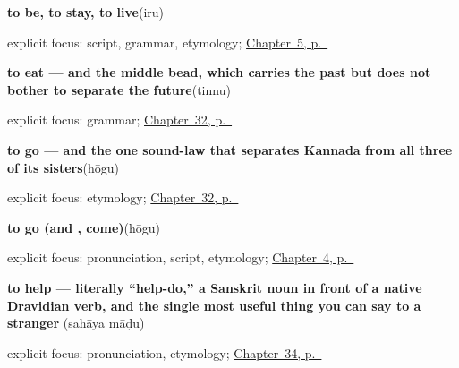\noindent\begin{minipage}[t]{\linewidth}
\raggedright
\textbf{to be, to stay, to live}\enspace\emph{}\enspace(iru)\par
\footnotesize explicit focus: script, grammar, etymology; \hyperref[ch:first-verbs]{Chapter~5, p.~\pageref*{ch:first-verbs}}
\end{minipage}\par\smallskip

\noindent\begin{minipage}[t]{\linewidth}
\raggedright
\textbf{to eat — and the middle bead, which carries the past but does not bother to separate the future}\enspace\emph{}\enspace(tinnu)\par
\footnotesize explicit focus: grammar; \hyperref[ch:ka-core-verbs]{Chapter~32, p.~\pageref*{ch:ka-core-verbs}}
\end{minipage}\par\smallskip

\noindent\begin{minipage}[t]{\linewidth}
\raggedright
\textbf{to go — and the one sound-law that separates Kannada from all three of its sisters}\enspace\emph{}\enspace(hōgu)\par
\footnotesize explicit focus: etymology; \hyperref[ch:ka-core-verbs]{Chapter~32, p.~\pageref*{ch:ka-core-verbs}}
\end{minipage}\par\smallskip

\noindent\begin{minipage}[t]{\linewidth}
\raggedright
\textbf{to go (and , come)}\enspace\emph{}\enspace(hōgu)\par
\footnotesize explicit focus: pronunciation, script, etymology; \hyperref[ch:farewells]{Chapter~4, p.~\pageref*{ch:farewells}}
\end{minipage}\par\smallskip

\noindent\begin{minipage}[t]{\linewidth}
\raggedright
\textbf{to help — literally \textquotedblleft{}help-do,\textquotedblright{} a Sanskrit noun in front of a native Dravidian verb, and the single most useful thing you can say to a stranger}\enspace\emph{ }\enspace(sahāya māḍu)\par
\footnotesize explicit focus: pronunciation, etymology; \hyperref[ch:ka-social-verbs]{Chapter~34, p.~\pageref*{ch:ka-social-verbs}}
\end{minipage}\par\smallskip

